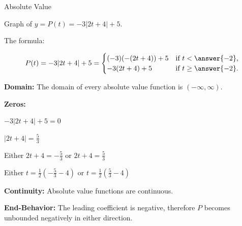 \documentclass{ximera}
\begin{document}
\begin{example}  Absolute Value

Graph of $y = P(t) = -3|2t+4|+5$.


\begin{image}
\end{image}

The formula:

\[
P(t) = -3|2t+4|+5 = 
\begin{cases}
  (-3)(-(2t+4))+5 & \text{if $t < \answer{-2}$,}\\
   -3(2t+4)+5 & \text{if $t \ge \answer{-2}$}.
\end{cases}
\]



\textbf{Domain:} The domain of every absolute value function is $(-\infty, \infty)$.

\textbf{Zeros:}

\begin{center}
$-3|2t+4|+5 = 0$

$|2t+4| = \frac{5}{3}$

Either $2t+4 = -\frac{5}{3}$ or $2t+4 = \frac{5}{3}$

Either $t = \frac{1}{2} \left( -\frac{5}{3}-4 \right)$ or $t = \frac{1}{2} \left(\frac{5}{3} - 4 \right)$

\end{center}





\textbf{Continuity:} Absolute value functions are continuous.

\textbf{End-Behavior:} The leading coefficient is negative, therefore $P$ becomes unbounded negatively in either direction.


\end{example}
\end{document}
